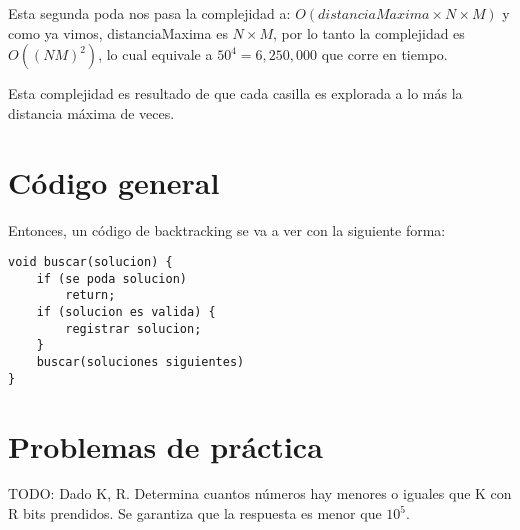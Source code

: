 Esta segunda poda nos pasa la complejidad a: \(O(distanciaMaxima\times N \times M)\) y como ya vimos, distanciaMaxima es \(N\times M\), por lo tanto la complejidad es \(O((NM)^2)\), lo cual equivale a \(50^4=6,250,000\) que corre en tiempo.

Esta complejidad es resultado de que cada casilla es explorada a lo más la distancia máxima de veces.
\pagebreak
\section{Código general}

Entonces, un código de backtracking se va a ver con la siguiente forma:
\begin{lstlisting}
void buscar(solucion) {
	if (se poda solucion)
		return;
	if (solucion es valida) {
		registrar solucion;
	}
	buscar(soluciones siguientes)
}
\end{lstlisting}

\section*{Problemas de práctica}

\begin{exercise}
\end{exercise}

\begin{exercise}
\end{exercise}

\begin{exercise}
TODO: Dado K, R. Determina cuantos números hay menores o iguales que K con R bits  prendidos. Se garantiza que la respuesta es menor que \(10^5\).
\end{exercise}